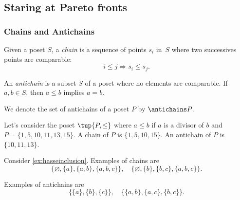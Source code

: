 \subsection{Staring at Pareto fronts}

\subsubsection{Chains and Antichains} \label{sec:chains-antichains}


\begin{definition}
\label{def:chain}
Given a poset $S$, a \emph{chain} is a sequence of points ${s_i}$ in~$S$ where two successives points are comparable:
\begin{equation}
    i \leq j \Rightarrow s_i \leq s_j.
\end{equation}
\end{definition}

 
\begin{definition}
\label{def:antichain}
An \emph{antichain} is a subset $S$ of a poset where no elements are comparable. If $a,b \in S$, then $a \leq b$ implies $a=b$.
\end{definition}

We denote the set of antichains of a poset $P$ by $\antichains P$.

\begin{example}
Let's consider the poset $\tup{P,\leq}$ where $a\leq b$ if $a$ is a divisor of $b$ and $P=\{1,5,10,11,13,15\}$. A chain of $P$ is $\{1,5,10,15\}$. An antichain of $P$ is $\{10,11,13\}$.
\end{example}

\begin{example}
Consider \cref{ex:hasseinclusion}. Examples of chains are 
\begin{equation}
    \{\varnothing,\{a\},\{a,b\},\{a,b,c\}\}, \quad  \{\varnothing,\{b\},\{b,c\},\{a,b,c\}\}.
\end{equation}

Examples of antichains are
\begin{equation}
    \{\{a\},\{b\},\{c\}\}, \quad \{ \{a,b\},\{a,c\}, \{b,c\}\}.
\end{equation}
\end{example}


